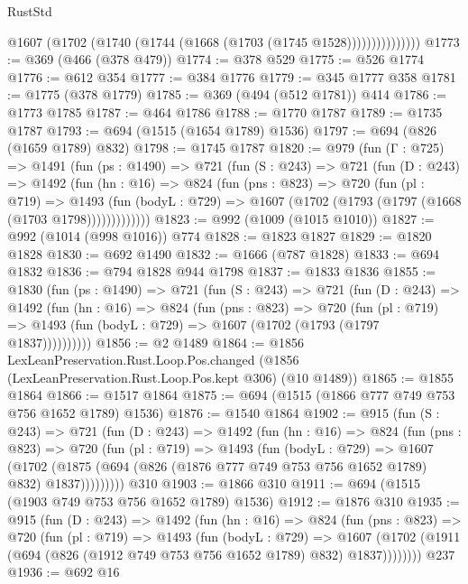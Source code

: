 \begin{lexlean}{RustStd}
\begin{coremodule}
                    @1607 (@1702 (@1740 (@1744 (@1668 (@1703 (@1745 @1528)))))))))))))))
@1773 := @369 (@466 (@378 @479))
@1774 := @378 @529
@1775 := @526 @1774
@1776 := @612 @354
@1777 := @384 @1776
@1779 := @345 @1777 @358
@1781 := @1775 (@378 @1779)
@1785 := @369 (@494 (@512 @1781)) @414
@1786 := @1773 @1785
@1787 := @464 @1786
@1788 := @1770 @1787
@1789 := @1735 @1787
@1793 := @694 (@1515 (@1654 @1789) @1536)
@1797 := @694 (@826 (@1659 @1789) @832)
@1798 := @1745 @1787
@1820 := @979
    (fun (Γ : @725) =>
    @1491
      (fun (ps : @1490) =>
      @721
        (fun (S : @243) =>
        @721
          (fun (D : @243) =>
          @1492
            (fun (hn : @16) =>
            @824
              (fun (pns : @823) =>
              @720
                (fun (pl : @719) =>
                @1493
                  (fun (bodyL : @729) => @1607 (@1702 (@1793 (@1797 (@1668 (@1703 @1798)))))))))))))
@1823 := @992 (@1009 (@1015 @1010))
@1827 := @992 (@1014 (@998 @1016)) @774
@1828 := @1823 @1827
@1829 := @1820 @1828
@1830 := @692 @1490
@1832 := @1666 (@787 @1828)
@1833 := @694 @1832
@1836 := @794 @1828 @944 @1798
@1837 := @1833 @1836
@1855 := @1830
    (fun (ps : @1490) =>
    @721
      (fun (S : @243) =>
      @721
        (fun (D : @243) =>
        @1492
          (fun (hn : @16) =>
          @824
            (fun (pns : @823) =>
            @720
              (fun (pl : @719) =>
              @1493 (fun (bodyL : @729) => @1607 (@1702 (@1793 (@1797 @1837))))))))))
@1856 := @2 @1489
@1864 := @1856
    LexLeanPreservation.Rust.Loop.Pos.changed
    (@1856 (LexLeanPreservation.Rust.Loop.Pos.kept @306) (@10 @1489))
@1865 := @1855 @1864
@1866 := @1517 @1864
@1875 := @694 (@1515 (@1866 @777 @749 @753 @756 @1652 @1789) @1536)
@1876 := @1540 @1864
@1902 := @915
    (fun (S : @243) =>
    @721
      (fun (D : @243) =>
      @1492
        (fun (hn : @16) =>
        @824
          (fun (pns : @823) =>
          @720
            (fun (pl : @719) =>
            @1493
              (fun (bodyL : @729) =>
              @1607
                (@1702
                  (@1875 (@694 (@826 (@1876 @777 @749 @753 @756 @1652 @1789) @832) @1837)))))))))
    @310
@1903 := @1866 @310
@1911 := @694 (@1515 (@1903 @749 @753 @756 @1652 @1789) @1536)
@1912 := @1876 @310
@1935 := @915
    (fun (D : @243) =>
    @1492
      (fun (hn : @16) =>
      @824
        (fun (pns : @823) =>
        @720
          (fun (pl : @719) =>
          @1493
            (fun (bodyL : @729) =>
            @1607 (@1702 (@1911 (@694 (@826 (@1912 @749 @753 @756 @1652 @1789) @832) @1837))))))))
    @237
@1936 := @692 @16

\end{coremodule}
\end{lexlean}
